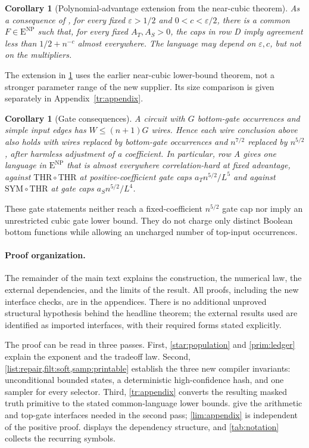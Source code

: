 \documentclass[11pt,letterpaper]{article}
\newtheorem{corollary}[theorem]{Corollary}
\theoremstyle{definition}
\theoremstyle{remark}
\newcommand{\THR}{\mathrm{THR}}
\newcommand{\SYM}{\mathrm{SYM}}
\newcommand{\ENP}{\mathrm{E}^{\mathrm{NP}}}
\begin{document}
\begin{corollary}[Polynomial-advantage extension from the near-cubic theorem]
\label{cor:poly-prior}
As a consequence of \cite[Theorem~2.3]{NagCubic}, for every fixed
$\varepsilon>1/2$ and $0<c<\varepsilon/2$, there is a common
$F\in\ENP$ such that, for every fixed $A_T,A_S>0$, the caps in row D
imply agreement less than $1/2+n^{-c}$ almost everywhere.
The language may depend on $\varepsilon,c$, but not on the multipliers.
\end{corollary}

The extension in \cref{cor:poly-prior} uses the earlier near-cubic
lower-bound theorem, not a stronger parameter range of the new supplier.
Its size comparison is given separately in Appendix~\ref{tr:appendix}.

\begin{corollary}[Gate consequences]
\label{cor:gates}
A circuit with $G$ bottom-gate occurrences and simple input edges has
$W\le(n+1)G$ wires. Hence each wire conclusion above also holds with wires
replaced by bottom-gate occurrences and $n^{7/2}$ replaced by
$n^{5/2}$, after harmless adjustment of a coefficient. In particular,
row A gives one language in $\ENP$ that is almost everywhere
correlation-hard at fixed advantage, against $\THR\circ\THR$ at
positive-coefficient gate caps $a_Tn^{5/2}/L^5$ and against
$\SYM\circ\THR$ at gate caps $a_Sn^{5/2}/L^4$.
\end{corollary}

These gate statements neither reach a fixed-coefficient $n^{5/2}$ gate
cap nor imply an unrestricted cubic gate lower bound. They do not
charge only distinct Boolean bottom functions while allowing an
uncharged number of top-input occurrences.

\paragraph{Proof organization.}
The remainder of the main text explains the construction, the numerical
law, the external dependencies, and the limits of the result. All proofs,
including the new interface checks, are in the appendices. There is no
additional unproved structural hypothesis behind the headline theorem;
the external results used are identified as imported interfaces, with
their required forms stated explicitly.

The proof can be read in three passes. First, \cref{star:population}
and \cref{prim:ledger} explain the exponent and the tradeoff law.
Second, \cref{list:repair,filt:soft,samp:printable} establish the three
new compiler invariants: unconditional bounded states, a deterministic
high-confidence hash, and one sampler for every selector. Third,
\cref{tr:appendix} converts the resulting masked truth primitive to the
stated common-language lower bounds. 
give the arithmetic and top-gate interfaces needed in the second pass;
\cref{lim:appendix} is independent of the positive proof.
 displays the dependency structure, and
\cref{tab:notation} collects the recurring symbols.
\end{document}
